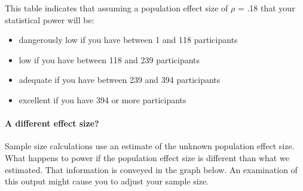 \documentclass[
]{krantz}
\begin{document}
This table indicates that assuming a population effect size of \(\rho\) = .18 that your statistical power will be:

\begin{itemize}
\item
  dangerously low if you have between 1 and 118 participants
\item
  low if you have between 118 and 239 participants
\item
  adequate if you have between 239 and 394 participants
\item
  excellent if you have 394 or more participants
\end{itemize}

\hypertarget{a-different-effect-size-2}{%
\paragraph{A different effect size?}\label{a-different-effect-size-2}}

Sample size calculations use an estimate of the unknown population effect size. What happens to power if the population effect size is different than what we estimated. That information is conveyed in the graph below. An examination of this output might cause you to adjust your sample size.
\end{document}
